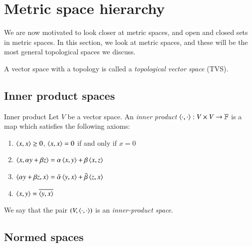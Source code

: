 \section{Metric space hierarchy}
\label{sec:metric-spaces}

We are now motivated to look closer at metric spaces, and open and closed sets in metric spaces. In this section, we look at metric spaces, and these will be the most general topological spaces we discuss.

A vector space with a topology is called a \emph{topological vector space} (TVS).


\subsection{Inner product spaces}
\label{sec:inner-product-spaces}

\begin{myDefinition}{Inner product}{}
    Let $V$ be a vector space.
    An \emph{inner product} $\braket{\cdot, \cdot} : V\times V \to \mathbb{F}$ is a map which satisfies the following axioms:
   \begin{enumerate}
       \item $\braket{x,x} \geq 0$, \quad $\braket{x,x} = 0$ if and only if $x = 0$ \hfill {}
       \item $\braket{x,\alpha y + \beta z} = \alpha\braket{x,y} + \beta\braket{x,z}$ 
       \item $\braket{\alpha y + \beta z, x} = \bar{\alpha}\braket{y,x} + \bar{\beta}\braket{z,x}$ 
       \item $\braket{x,y} = \overline{\braket{y,x}}$ 
   \end{enumerate}
   We say that the pair $(V,\braket{\cdot,\cdot})$ is an \emph{inner-product space}.
\end{myDefinition}

\subsection{Normed spaces}
\label{sec:normed-spaces}

